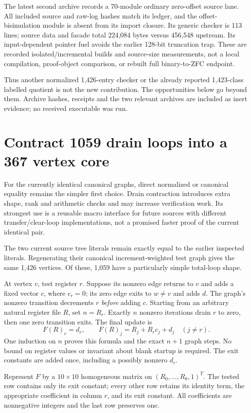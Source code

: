 \documentclass[11pt]{article}
\begin{document}
The latest second archive records a 70-module ordinary zero-offset source lane. All included source and raw-log hashes match its ledger, and the offset-bisimulation module is absent from its import closure. Its generic checker is 113 lines; source data and facade total 224,084 bytes versus 456,548 upstream. Its input-dependent pointer fuel avoids the earlier 128-bit truncation trap. These are recorded isolated/incremental builds and source-size measurements, not a local compilation, proof-object comparison, or rebuilt full binary-to-ZFC endpoint.

Thus another normalized 1,426-entry checker or the already reported 1,423-class labelled quotient is not the new contribution. The opportunities below go beyond them. Archive hashes, receipts and the two relevant archives are included as inert evidence; no received executable was run.

\section{Contract 1059 drain loops into a 367 vertex core}
For the currently identical canonical graphs, direct normalized or canonical equality remains the simpler first choice. Drain contraction introduces extra shape, rank and arithmetic checks and may increase verification work. Its strongest use is a reusable macro interface for future sources with different transfer/clear-loop implementations, not a promised faster proof of the current identical pair.

The two current source tree literals remain exactly equal to the earlier inspected literals. Regenerating their canonical increment-weighted test graph gives the same 1,426 vertices. Of these, 1,059 have a particularly simple total-loop shape.

At vertex $v$, test register $r$. Suppose its nonzero edge returns to $v$ and adds a fixed vector $c$, where $c_r=0$; its zero edge exits to $w\ne v$ and adds $d$. The graph's nonzero transition decrements $r$ \emph{before} adding $c$. Starting from an arbitrary natural register file $R$, set $n=R_r$. Exactly $n$ nonzero iterations drain $r$ to zero, then one zero transition exits. The final update is
\[
 F(R)_r=d_r,\qquad
 F(R)_j=R_j+R_r c_j+d_j\quad(j\ne r).
\]
One induction on $n$ proves this formula and the exact $n+1$ graph steps. No bound on register values or invariant about blank startup is required. The exit constants are added once, including a possibly nonzero $d_r$.

Represent $F$ by a $10\times10$ homogeneous matrix on $(R_0,\ldots,R_8,1)^T$. The tested row contains only its exit constant; every other row retains its identity term, the appropriate coefficient in column $r$, and its exit constant. All coefficients are nonnegative integers and the last row preserves one.
\end{document}
